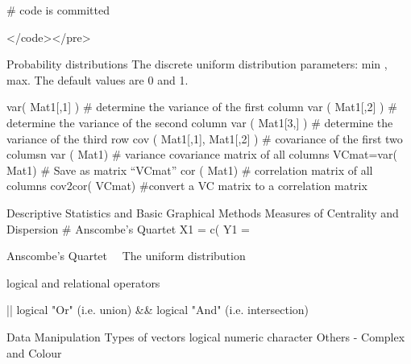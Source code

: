 # code is committed
 
</code></pre>

 
Probability distributions
The discrete uniform distribution
parameters: min , max.
The default values are 0 and 1.
 



var( Mat1[,1] )			# determine the variance of the first column 
var ( Mat1[,2] )			# determine the variance of the second column
var ( Mat1[3,] )			# determine the variance of the third row
cov ( Mat1[,1], Mat1[,2] )	# covariance of the first two columsn
var ( Mat1)			# variance covariance matrix of all columns
VCmat=var( Mat1)		# Save as matrix “VCmat”
cor ( Mat1)			# correlation matrix of all columns
cov2cor( VCmat)		#convert a VC matrix to a correlation matrix

 
Descriptive Statistics and Basic Graphical Methods
Measures of Centrality and Dispersion
# Anscombe’s  Quartet
X1 = c(
Y1 =
 

Anscombe’s Quartet 
The uniform distribution





logical and relational operators
 
||      logical "Or"      (i.e.  union)
&&     logical "And"   (i.e. intersection)   

 



Data Manipulation
Types of vectors
	logical
	numeric
	character
    Others  - Complex and Colour

